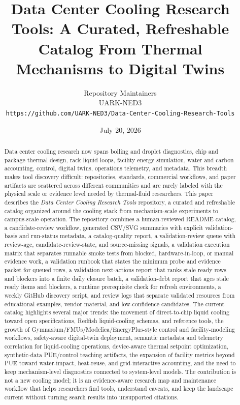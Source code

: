 \documentclass[11pt]{article}
\title{Data Center Cooling Research Tools: A Curated, Refreshable Catalog From Thermal Mechanisms to Digital Twins}
\author{Repository Maintainers\\UARK-NED3\\\texttt{https://github.com/UARK-NED3/Data-Center-Cooling-Research-Tools}}
\date{July 20, 2026}
\begin{document}
\maketitle

\begin{abstract}
Data center cooling research now spans boiling and droplet diagnostics, chip and package thermal design, rack liquid loops, facility energy simulation, water and carbon accounting, control, digital twins, operations telemetry, and metadata. This breadth makes tool discovery difficult: repositories, standards, commercial workflows, and paper artifacts are scattered across different communities and are rarely labeled with the physical scale or evidence level needed by thermal-fluid researchers. This paper describes the \emph{Data Center Cooling Research Tools} repository, a curated and refreshable catalog organized around the cooling stack from mechanism-scale experiments to campus-scale operation. The repository combines a human-reviewed README catalog, a candidate-review workflow, generated CSV/SVG summaries with explicit validation-basis and run-status metadata, a catalog-quality report, a validation-review queue with review-age, candidate-review-state, and source-missing signals, a validation execution matrix that separates runnable smoke tests from blocked, hardware-in-loop, or manual evidence work, a validation runbook that states the minimum probe and evidence packet for queued rows, a validation next-actions report that ranks stale ready rows and blockers into a finite daily closure batch, a validation-debt report that ages stale ready items and blockers, a runtime prerequisite check for refresh environments, a weekly GitHub discovery script, and review logs that separate validated resources from educational examples, vendor material, and low-confidence candidates. The current catalog highlights several major trends: the movement of direct-to-chip liquid cooling toward open specifications, Redfish liquid-cooling schemas, and reference tools, the growth of Gymnasium/FMUs/Modelica/EnergyPlus-style control and facility-modeling workflows, safety-aware digital-twin deployment, semantic metadata and telemetry correlation for liquid-cooling operations, device-aware thermal setpoint optimization, synthetic-data PUE/control teaching artifacts, the expansion of facility metrics beyond PUE toward water-impact, heat-reuse, and grid-interactive accounting, and the need to keep mechanism-level diagnostics connected to system-level models. The contribution is not a new cooling model; it is an evidence-aware research map and maintenance workflow that helps researchers find tools, understand caveats, and keep the landscape current without turning search results into unsupported citations.
\end{abstract}
\end{document}
